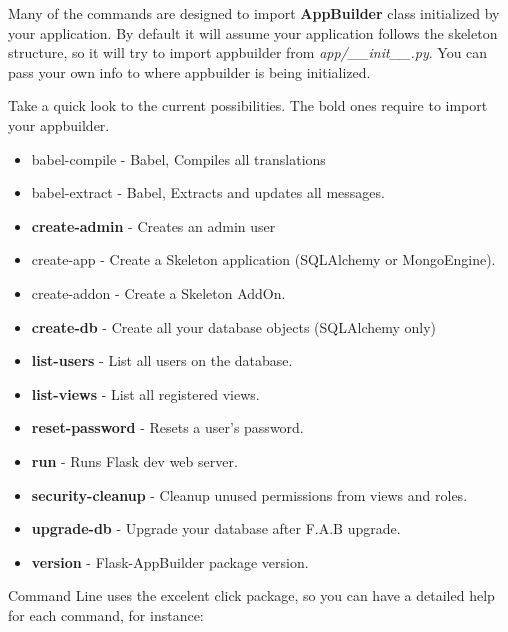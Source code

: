 \documentclass[letterpaper,10pt,english]{sphinxmanual}
\begin{document}
Many of the commands are designed to import \textbf{AppBuilder} class initialized by your application.
By default it will assume your application follows the skeleton structure, so it will try to import
appbuilder from \emph{app/\_\_init\_\_.py}. You can pass your own info to where appbuilder is being initialized.

Take a quick look to the current possibilities. The bold ones require to import your appbuilder.
\begin{itemize}
\item {} 
babel-compile - Babel, Compiles all translations

\item {} 
babel-extract - Babel, Extracts and updates all messages.

\item {} 
\textbf{create-admin} - Creates an admin user

\item {} 
create-app - Create a Skeleton application (SQLAlchemy or MongoEngine).

\item {} 
create-addon - Create a Skeleton AddOn.

\item {} 
\textbf{create-db} - Create all your database objects (SQLAlchemy only)

\item {} 
\textbf{list-users} - List all users on the database.

\item {} 
\textbf{list-views} - List all registered views.

\item {} 
\textbf{reset-password} - Resets a user's password.

\item {} 
\textbf{run} - Runs Flask dev web server.

\item {} 
\textbf{security-cleanup} - Cleanup unused permissions from views and roles.

\item {} 
\textbf{upgrade-db} - Upgrade your database after F.A.B upgrade.

\item {} 
\textbf{version} - Flask-AppBuilder package version.

\end{itemize}

Command Line uses the excelent click package, so you can have a detailed help for each command, for instance:
\end{document}
